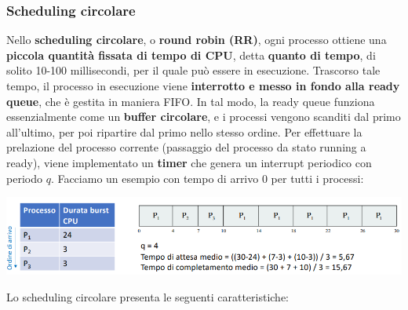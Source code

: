 \documentclass[12pt]{article}
\begin{document}
\subsubsection{Scheduling circolare}
Nello \textbf{scheduling circolare}, o \textbf{round robin (RR)}, ogni processo ottiene una \textbf{piccola quantità fissata di tempo di CPU}, detta \textbf{quanto di tempo}, di solito 10-100 millisecondi, per il quale
può essere in esecuzione. Trascorso tale tempo, il processo in esecuzione viene \textbf{interrotto e messo in fondo alla ready queue}, che è gestita in maniera FIFO.
In tal modo, la ready queue funziona essenzialmente come un \textbf{buffer circolare}, e i processi vengono scanditi dal primo all'ultimo, per poi ripartire dal primo nello stesso ordine.
Per effettuare la prelazione del processo corrente (passaggio del processo da stato running a ready), viene implementato un \textbf{timer} che genera un interrupt periodico con periodo $q$.
Facciamo un esempio con tempo di arrivo $0$ per tutti i processi:
\begin{center}
    \includegraphics[width = 0.90\linewidth]{Images/47.png}
\end{center}
Lo scheduling circolare presenta le seguenti caratteristiche:
\end{document}
